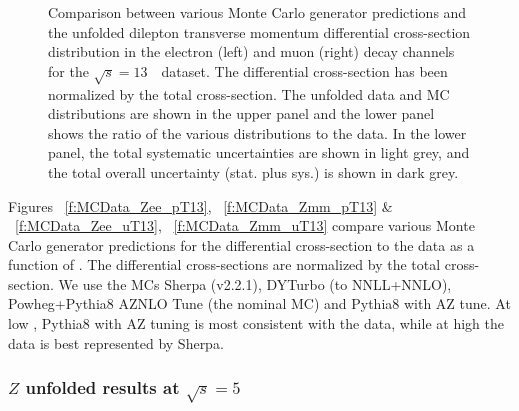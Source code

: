 \begin{figure}[h]
\centering
{}

\caption{Comparison between various Monte Carlo generator predictions and the unfolded dilepton transverse momentum differential cross-section distribution in the electron (left) and muon (right) \Zboson decay channels for the $\sqrt{s} = 13$~\TeV\ dataset. The differential cross-section has been normalized by the total cross-section. The unfolded data and MC distributions are shown in the upper panel and the lower panel shows the ratio of the various distributions to the data. In the lower panel, the total systematic uncertainties are shown in light grey, and the total overall uncertainty (stat. plus sys.) is shown in dark grey.}\label{f:MCData_Z_13}
\end{figure}


Figures ~\ref{f:MCData_Zee_pT13}, ~\ref{f:MCData_Zmm_pT13} \& ~\ref{f:MCData_Zee_uT13}, ~\ref{f:MCData_Zmm_uT13} compare various Monte Carlo generator predictions for the differential \pTZ cross-section to the data as a function of \pT. The differential cross-sections are normalized by the total cross-section. We use the MCs Sherpa (v2.2.1), DYTurbo (to NNLL+NNLO), Powheg+Pythia8 AZNLO Tune (the nominal MC) and Pythia8 with AZ tune. At low \pT, Pythia8 with AZ tuning is most consistent with the data, while at high \pT the data is best represented by Sherpa.

\clearpage



\subsubsection{$Z$ unfolded results at $\sqrt{s} = 5$~\TeV}
\label{ssec:Zunf5TeV}

